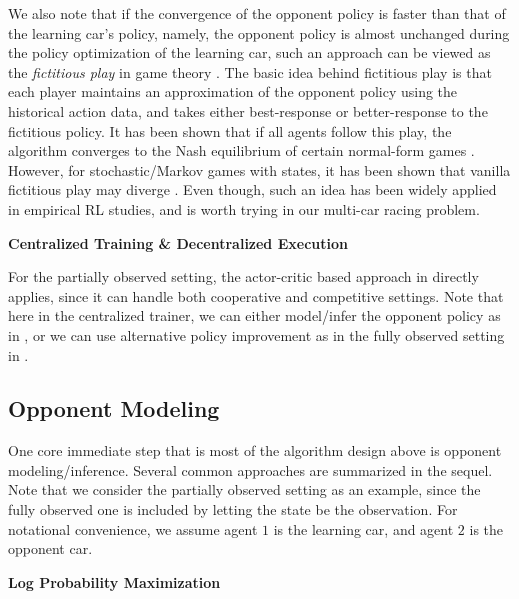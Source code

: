 We also note that if the convergence of the opponent policy is faster than that of the learning car's policy, namely, the opponent policy is almost unchanged during the policy optimization of the learning car, such an approach can be viewed as the \emph{fictitious play} in game theory \citep{brown1951iterative,monderer1996fictitious}. The basic idea behind fictitious play is that each player maintains an approximation of the opponent policy using the historical action data, and takes either best-response or better-response to the fictitious policy. It has been shown that if all agents follow this play, the algorithm converges to the Nash equilibrium of certain normal-form games \citep{monderer1996fictitious,shamma2005dynamic}. However, for stochastic/Markov games with states, it has been shown that vanilla fictitious play may diverge \citep{schoenmakers2007fictitious}. Even though, such an idea has been widely applied in 
empirical RL studies, and is  worth trying in our multi-car racing problem. 


\vspace{7pt}
\noindent\textbf{Centralized Training \& Decentralized Execution}
\vspace{3pt}


For the partially observed setting, the actor-critic based approach in \cite{lowe2017multi} directly applies, since it can handle both cooperative and competitive settings. Note that here in the centralized trainer, we can either model/infer the opponent policy as in \cite{he2016opponent,lowe2017multi}, or we can use alternative policy improvement as in the fully observed setting in \cite{pinto2017robust}. 



\subsection{Opponent Modeling}\label{sec:opponet_model}

One core immediate step that is most of the algorithm design  above is opponent modeling/inference. Several common approaches  are summarized in the sequel. 
Note that we consider the partially observed setting as an example, since the fully observed one is included by letting the state be the observation. 
For notational convenience, we assume agent $1$ is the learning car, and agent $2$ is the opponent car. 

\vspace{7pt}
\noindent\textbf{Log Probability Maximization}
\vspace{3pt}

